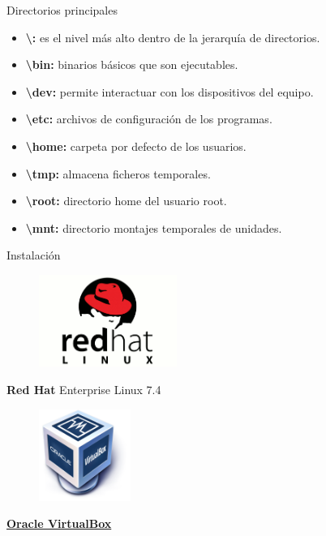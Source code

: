 \documentclass{beamer}
\begin{document}
\begin{frame}{Directorios principales}
\begin{itemize}
\item \textbf{\textbackslash :} es el nivel más alto dentro de la jerarquía de directorios.
\item \textbf{\textbackslash bin:} binarios básicos que son ejecutables.
\item \textbf{\textbackslash dev:} permite interactuar con los dispositivos del equipo.
\item \textbf{\textbackslash etc:} archivos de configuración de los programas.
\item \textbf{\textbackslash home:} carpeta por defecto de los usuarios.
\item \textbf{\textbackslash tmp:} almacena ficheros temporales.
\item \textbf{\textbackslash root:} directorio home del usuario root. 
\item \textbf{\textbackslash mnt:} directorio montajes temporales de unidades.
\end{itemize}
\end{frame}
\begin{frame}{Instalación}
\begin{multicols}{2}
\centering
\begin{figure}
	\includegraphics[height=3cm]{img/rhel.png}
\end{figure}
\textbf{Red Hat} Enterprise Linux 7.4
\begin{figure}
	\includegraphics[height=3cm]{img/Virtualbox.png}
\end{figure}
\textbf{ \href{https://download.virtualbox.org/virtualbox/6.0.4/VirtualBox-6.0.4-128413-Win.exe}{Oracle VirtualBox}}

\end{multicols}

\end{frame}
\end{document}
